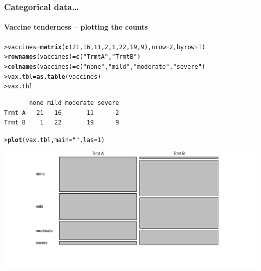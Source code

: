 \documentclass{beamer}\usepackage[]{graphicx}\usepackage[]{xcolor}
\makeatletter
\def\maxwidth{ %
  \ifdim\Gin@nat@width>\linewidth
    \linewidth
  \else
    \Gin@nat@width
  \fi
}
\newcommand{\hlnum}[1]{\textcolor[rgb]{0.686,0.059,0.569}{#1}}%
\newcommand{\hlstr}[1]{\textcolor[rgb]{0.192,0.494,0.8}{#1}}%
\newcommand{\hlstd}[1]{\textcolor[rgb]{0.345,0.345,0.345}{#1}}%
\newcommand{\hlkwb}[1]{\textcolor[rgb]{0.69,0.353,0.396}{#1}}%
\newcommand{\hlkwc}[1]{\textcolor[rgb]{0.333,0.667,0.333}{#1}}%
\newcommand{\hlkwd}[1]{\textcolor[rgb]{0.737,0.353,0.396}{\textbf{#1}}}%
\newenvironment{kframe}{%
 \def\at@end@of@kframe{}%
 \ifinner\ifhmode%
  \def\at@end@of@kframe{\end{minipage}}%
  \begin{minipage}{\columnwidth}%
 \fi\fi%
 \def\FrameCommand##1{\hskip\@totalleftmargin \hskip-\fboxsep
 \colorbox{shadecolor}{##1}\hskip-\fboxsep
     \hskip-\linewidth \hskip-\@totalleftmargin \hskip\columnwidth}%
 \MakeFramed {\advance\hsize-\width
   \@totalleftmargin\z@ \linewidth\hsize
   \@setminipage}}%
 {\par\unskip\endMakeFramed%
 \at@end@of@kframe}
\newenvironment{knitrout}{}{} %
\makeatother
\begin{document}
\begin{frame}[fragile]
\frametitle{Categorical data\ldots}
\framesubtitle{Vaccine tenderness -- plotting the counts}

\begin{knitrout}\scriptsize
{}\color{fgcolor}\begin{kframe}
\begin{alltt}
\hlstd{> }\hlstd{vaccines}\hlkwb{=}\hlkwd{matrix}\hlstd{(}\hlkwd{c}\hlstd{(}\hlnum{21}\hlstd{,}\hlnum{16}\hlstd{,}\hlnum{11}\hlstd{,}\hlnum{2}\hlstd{,}\hlnum{1}\hlstd{,}\hlnum{22}\hlstd{,}\hlnum{19}\hlstd{,}\hlnum{9}\hlstd{),}\hlkwc{nrow}\hlstd{=}\hlnum{2}\hlstd{,}\hlkwc{byrow}\hlstd{=T)}
\hlstd{> }\hlkwd{rownames}\hlstd{(vaccines)}\hlkwb{=}\hlkwd{c}\hlstd{(}\hlstr{"Trmt A"}\hlstd{,}\hlstr{"Trmt B"}\hlstd{)}
\hlstd{> }\hlkwd{colnames}\hlstd{(vaccines)}\hlkwb{=}\hlkwd{c}\hlstd{(}\hlstr{"none"}\hlstd{,}\hlstr{"mild"}\hlstd{,}\hlstr{"moderate"}\hlstd{,}\hlstr{"severe"}\hlstd{)}
\hlstd{> }\hlstd{vax.tbl}\hlkwb{=}\hlkwd{as.table}\hlstd{(vaccines)}
\hlstd{> }\hlstd{vax.tbl}
\end{alltt}
\begin{verbatim}
       none mild moderate severe
Trmt A   21   16       11      2
Trmt B    1   22       19      9
\end{verbatim}
\begin{alltt}
\hlstd{> }\hlkwd{plot}\hlstd{(vax.tbl,}\hlkwc{main}\hlstd{=}\hlstr{""}\hlstd{,}\hlkwc{las}\hlstd{=}\hlnum{1}\hlstd{)}
\end{alltt}
\end{kframe}
\includegraphics[width=\maxwidth]{figure/RC-H16-002d-1} 
\end{knitrout}

\end{frame}
\end{document}
